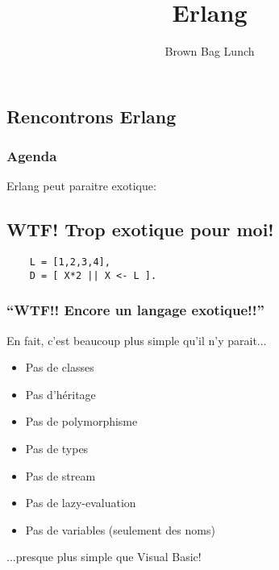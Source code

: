 \documentclass[notes=only]{beamer}
\title{Erlang}
\author{Brown Bag Lunch}\institute{Bernard Notarianni}
\begin{document}
\begin{frame}

  \titlepage

\end{frame}

\begin{frame}
  \section[Rencontre]{Rencontrons Erlang}

  \frametitle{Agenda}
  \tableofcontents
\end{frame}

\begin{frame}[fragile]
  Erlang peut paraitre exotique:
  \subsection[WTF]{WTF! Trop exotique pour moi!}

  \begin{verbatim}
    L = [1,2,3,4],
    D = [ X*2 || X <- L ].
  \end{verbatim}


  \frametitle{``WTF!! Encore un langage exotique!!''}
  En fait, c'est beaucoup plus simple qu'il n'y parait...
  \begin{itemize}
  \item Pas de classes
  \item Pas d'héritage
  \item Pas de polymorphisme
  \item Pas de types
  \item Pas de stream
  \item Pas de lazy-evaluation
  \item Pas de variables (seulement des noms)
  \end{itemize}
  ...presque plus simple que Visual Basic!

\end{frame}
\end{document}
